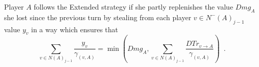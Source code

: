 \begin{definition}
  Player $A$ follows the Extended strategy if she partly replenishes the value $Dmg_A$ she lost since the previous turn by
  stealing from each player $v \in N^{-}\left(A\right)_{j-1}$ value $y_v$\emph{\bitcoin} in a way which ensures that
  \begin{equation*}
    \sum\limits_{v \in N\left(A\right)_{j-1}}\frac{y_v}{\gamma_{\left(v, A\right)}} = \min{\left(Dmg_A, \sum\limits_{v \in
    N\left(A\right)_{j-1}}\frac{DTr_{v \rightarrow A}}{\gamma_{\left(v, A\right)}}\right)} \enspace.
  \end{equation*}
\end{definition}
